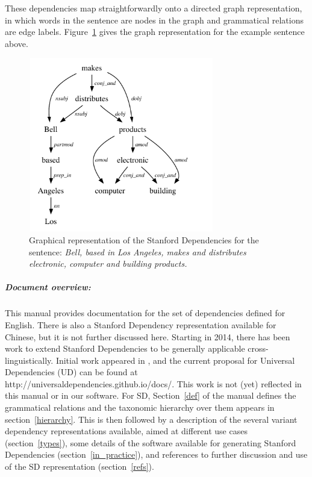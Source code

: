 \documentclass[11pt,letterpaper]{article}
\def\url#1{\textsf{#1}}
\begin{document}
These dependencies map straightforwardly onto a directed graph representation, in which words in the sentence are nodes in the graph and grammatical relations are edge labels. Figure~\ref{bell} gives the graph representation for the example sentence above.
\begin{figure}
\begin{center}
\includegraphics[width=3.2in, height=3.0in]{bell.pdf}
\end{center}
\vspace*{-0.6cm}
\caption{\label{bell} Graphical representation of the Stanford Dependencies for the sentence: \emph{Bell, based in Los Angeles, makes and distributes electronic, computer and building products.}}
\end{figure}

\subparagraph{Document overview:} This manual provides documentation for the set of dependencies defined
for English.  There is also a Stanford Dependency representation
available for Chinese, but it is not further discussed here.  Starting
in 2014, there has been work to extend Stanford Dependencies to be
generally applicable cross-linguistically. Initial work appeared in
\citet{marneffe14universal}, and the current proposal for Universal Dependencies (UD) can be found at
\url{http://universaldependencies.github.io/docs/}. This work is not
(yet) reflected in this manual or in our software.
For SD, Section~\ref{def} of the manual defines the grammatical relations and the taxonomic hierarchy over
them appears in section~\ref{hierarchy}.  This is then followed by a description of the several variant
dependency representations available, aimed at different use cases
(section~\ref{types}), some details of the software available for
generating Stanford Dependencies (section~\ref{in_practice}), and
references to further discussion and use of the SD representation (section~\ref{refs}).
\end{document}
